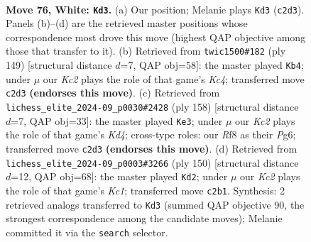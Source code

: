 \documentclass[11pt]{article}
\begin{document}
\clearpage

\begin{figure}[p]\centering
\begin{subfigure}{0.46\textwidth}\centering
\resizebox{\linewidth}{!}{%
\newchessgame
\chessboard[
  setfen={5R2/8/3k4/3b4/1P6/8/2K4r/4R3 w - - 25 76},
  showmover=false,
  pgfstyle=straightmove, color=movearrow, markmove={c2-d3}
]}
\caption{}
\end{subfigure}\hfill
\begin{subfigure}{0.46\textwidth}\centering
\resizebox{\linewidth}{!}{%
\newchessgame
\chessboard[
  setfen={8/8/8/2k1K3/4B3/8/3r4/2R5 b - - 8 75},
  showmover=false,
  pgfstyle=straightmove, color=movearrow, markmove={c5-b4}
]}
\caption{}
\end{subfigure}
\\[4pt]
\begin{subfigure}{0.46\textwidth}\centering
\resizebox{\linewidth}{!}{%
\newchessgame
\chessboard[
  setfen={8/8/3kb1P1/6R1/3K1r2/8/8/8 w - - 0 80},
  showmover=false,
  pgfstyle=straightmove, color=movearrow, markmove={d4-e3}
]}
\caption{}
\end{subfigure}\hfill
\begin{subfigure}{0.46\textwidth}\centering
\resizebox{\linewidth}{!}{%
\newchessgame
\chessboard[
  setfen={8/8/8/8/2bk4/8/1R6/2K4r w - - 50 76},
  showmover=false,
  pgfstyle=straightmove, color=movearrow, markmove={c1-d2}
]}
\caption{}
\end{subfigure}
\caption{\textbf{Move 76, White: \texttt{Kd3}.} (a) Our position; Melanie plays \texttt{Kd3} (\texttt{c2d3}). Panels (b)--(d) are the retrieved master positions whose correspondence most drove this move (highest QAP objective among those that transfer to it). (b) Retrieved from \texttt{twic1500\#182} (ply 149) [structural distance $d$=7, QAP obj=58]: the master played \texttt{Kb4}; under $\mu$ our \emph{Kc2} plays the role of that game's \emph{Kc4}; transferred move \texttt{c2d3} \textbf{(endorses this move)}. (c) Retrieved from \texttt{lichess\_elite\_2024-09\_p0030\#2428} (ply 158) [structural distance $d$=7, QAP obj=33]: the master played \texttt{Ke3}; under $\mu$ our \emph{Kc2} plays the role of that game's \emph{Kd4}; cross-type roles: our \emph{R}f8 as their \emph{P}g6; transferred move \texttt{c2d3} \textbf{(endorses this move)}. (d) Retrieved from \texttt{lichess\_elite\_2024-09\_p0003\#3266} (ply 150) [structural distance $d$=12, QAP obj=68]: the master played \texttt{Kd2}; under $\mu$ our \emph{Kc2} plays the role of that game's \emph{Kc1}; transferred move \texttt{c2b1}. Synthesis: 2 retrieved analogs transferred to \texttt{Kd3} (summed QAP objective 90, the strongest correspondence among the candidate moves); Melanie committed it via the \texttt{search} selector.}
\label{fig:thought-m150}
\end{figure}
\end{document}
